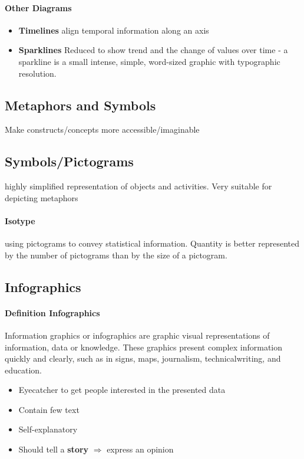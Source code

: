 \documentclass[10pt,a4paper]{article}
\begin{document}
	\paragraph{Other Diagrams}
	\begin{itemize}
		\item \textbf{Timelines} align temporal information along an axis
		\item \textbf{Sparklines} Reduced to show trend and the change of values over time - a sparkline is a small intense, simple, word-sized graphic with typographic resolution.
	\end{itemize}
	
	\subsection{Metaphors and Symbols}
	Make constructs/concepts more accessible/imaginable
	
	\subsection{Symbols/Pictograms}
	highly simplified representation of objects and activities. Very suitable for depicting metaphors
	
	\paragraph{Isotype} using pictograms to convey statistical information. Quantity is better represented by the number of pictograms than by the size of a pictogram.
	
	\subsection{Infographics}
	
	\paragraph{Definition Infographics} Information graphics or infographics are graphic visual representations of information, data or knowledge. These graphics present complex information quickly and clearly, such as in signs, maps, journalism, technicalwriting, and education.
	
	\begin{itemize}
		\item Eyecatcher to get people interested in the presented data
		\item Contain few text
		\item Self-explanatory
		\item Should tell a \textbf{story} $ \Rightarrow $ express an opinion
	\end{itemize}
	
\end{document}
